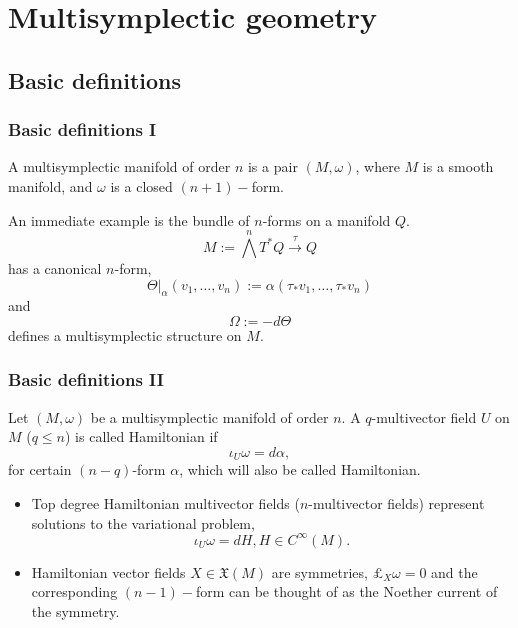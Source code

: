 \section{\bf Multisymplectic geometry}

\subsection{Basic definitions}
\begin{frame}
    \frametitle{Basic definitions I}
    \begin{definition} A \alert{multisymplectic manifold} of order $n$ is a pair $(M, \omega)$, where $M$
        is a smooth manifold, and $\omega$ is a closed $(n+1)-$form.
    \end{definition}
    An immediate example is the bundle of $n$-forms on a manifold $Q$. $$M:= \bigwedge^n T^\ast Q \xrightarrow{\tau} Q$$ has 
    a canonical $n$-form, 
    $$\Theta|_{\alpha}(v_1, \dots, v_n) := \alpha(\tau_\ast v_1, \dots, \tau_\ast v_n)$$ and
    $$\Omega := - d  \Theta$$ defines a multisymplectic structure on $M$. 
\end{frame}

\begin{frame}
    \frametitle{Basic definitions II}
    \begin{Def} Let $(M, \omega)$ be a multisymplectic manifold of order $n$. A $q$-multivector field $U$ on $M$ ($q \leq n$) is
        called \alert{Hamiltonian} if $$\iota_U \omega = d \alpha,$$ for certain $(n - q)$-form $\alpha$, which will also
        be called \alert{Hamiltonian}.
    \end{Def}
    \begin{itemize}
        \item Top degree Hamiltonian multivector fields ($n$-multivector fields) represent \alert{solutions} to the variational problem, 
        $$\iota_U \omega  = dH, H \in C^ \infty(M).$$
        \item Hamiltonian vector fields $X \in \mathfrak{X}(M)$ are \alert{symmetries,} $\pounds_X \omega = 0$ and the corresponding
        $(n-1)-$form can be thought of as the \alert{Noether current} of the symmetry.
    \end{itemize}
\end{frame}

